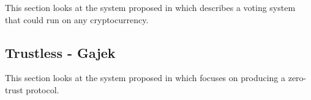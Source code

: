 This section looks at the system proposed in \cite{yuPlatformindependentSecureBlockchainBased2018} which describes a voting system that could run on any cryptocurrency.


\subsection{Trustless - Gajek}

This section looks at the system proposed in \cite{gajekTrustlessCensorshipResilientScalable2019} which focuses on producing a zero-trust protocol.


\newcommand*\YES{}
\newcommand*\NO{}

\newcommand*\NP{$n$}
\newcommand*\ALL{$Y$}
\newcommand*\SERVER{$Y_s$}
\newcommand*\REG{$Y_r$}
\newcommand*\SERVERREG{$Y_{rs}$}
\newcommand*\AUTH{$Y_a$}



